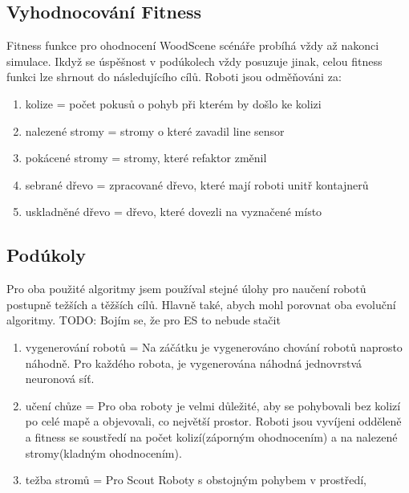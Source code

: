 \subsection{Vyhodnocování Fitness}
Fitness funkce pro ohodnocení WoodScene scénáře probíhá vždy až nakonci simulace. Ikdyž se úspěšnost v podúkolech  vždy posuzuje jinak, celou fitness funkci lze shrnout do následujícího cílů. Roboti jsou odměňováni za: 
\begin{enumerate}
        \item kolize = počet pokusů o pohyb při kterém by došlo ke kolizi 
        \item nalezené stromy = stromy o které zavadil line sensor 
        \item pokácené stromy = stromy, které refaktor změnil 
        \item sebrané dřevo = zpracované dřevo, které mají roboti unitř kontajnerů 
        \item uskladněné dřevo = dřevo, které dovezli na vyznačené místo 
\end{enumerate}
\subsection{Podúkoly} 
Pro oba použité algoritmy jsem používal stejné úlohy pro naučení robotů postupně težších a těžších cílů. Hlavně také, abych mohl porovnat oba evoluční algoritmy. TODO: Bojím se, že pro ES to nebude stačit 
\begin{enumerate}
        \item  vygenerování robotů = Na záčátku je vygenerováno chování robotů naprosto náhodně. Pro každého robota, je vygenerována náhodná jednovrstvá neuronová síť. 
        \item učení chůze = Pro oba roboty je velmi důležité, aby se pohybovali bez kolizí po celé mapě a objevovali, co největší prostor. Roboti jsou vyvíjeni odděleně a fitness se soustředí na počet kolizí(záporným ohodnocením) a na nalezené stromy(kladným ohodnocením).
        \item težba stromů = Pro Scout Roboty s obstojným pohybem v prostředí, 
\end{enumerate}
